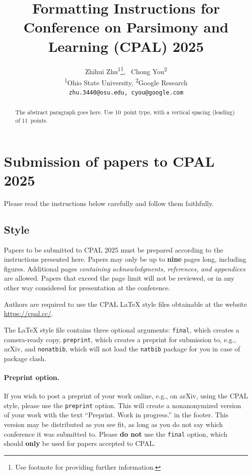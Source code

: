 \documentclass{article}
\title{Formatting Instructions for \\Conference on Parsimony and Learning (CPAL) 2025}
\author{%
  Zhihui Zhu\textsuperscript{1}\thanks{Use footnote for providing further information.}, ~Chong You\textsuperscript{2} \\
  \textsuperscript{1}Ohio State University, \textsuperscript{2}Google Research\\
  \texttt{zhu.3440@osu.edu, cyou@google.com}
}
\begin{document}
\maketitle


\begin{abstract}
  The abstract paragraph goes here. Use 10~point type, with a vertical
  spacing (leading) of 11~points. 
\end{abstract}


\section{Submission of papers to CPAL 2025}


Please read the instructions below carefully and follow them faithfully. 


\subsection{Style}


Papers to be submitted to CPAL 2025 must be prepared according to the
instructions presented here. Papers may only be up to {\bf nine} pages long,
including figures. Additional pages \emph{containing acknowledgments,
references, and appendices} are allowed. Papers that exceed the page limit will not be
reviewed, or in any other way considered for presentation at the conference.


Authors are required to use the CPAL \LaTeX{} style files obtainable at the website \url{https://cpal.cc/}.




The \LaTeX{} style file contains three optional arguments: \verb+final+, which
creates a camera-ready copy, \verb+preprint+, which creates a preprint for
submission to, e.g., arXiv, and \verb+nonatbib+, which will not load the
\verb+natbib+ package for you in case of package clash.


\paragraph{Preprint option.}
If you wish to post a preprint of your work online, e.g., on arXiv, using the
CPAL style, please use the \verb+preprint+ option. This will create a
nonanonymized version of your work with the text ``Preprint. Work in progress.''
in the footer. This version may be distributed as you see fit, as long as you do not say which conference it was submitted to. Please \textbf{do
  not} use the \verb+final+ option, which should \textbf{only} be used for
papers accepted to CPAL. 
\end{document}
